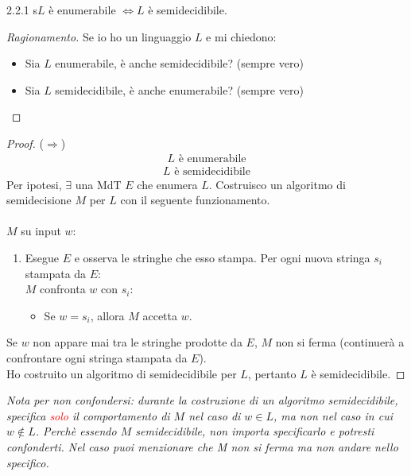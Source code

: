 \documentclass{article}  %
\theoremstyle{definition}
\newenvironment{ragionamento}[1][]
  {\begin{proof}[Ragionamento#1]\renewcommand{\qedsymbol}{}\normalfont}
  {\end{proof}}
\begin{document}
\begin{theorem}{2.2.1}
	s$L$ è enumerabile $\iff L$ è semidecidibile.
	\footnotesize %
	\begin{ragionamento}
		Se io ho un linguaggio $L$ e mi chiedono:
		\begin{itemize}
			\item Sia $L$ enumerabile, è anche semidecidibile? (sempre vero)
			\item Sia $L$ semidecidibile, è anche enumerabile? (sempre vero)
		\end{itemize}
	\end{ragionamento}
	\begin{proof} ($\Longrightarrow$) \\
		\begin{align*}
			L \text{ è enumerabile} \tag*{(ipotesi)}
		\end{align*}
		\begin{align*}
			L \text{ è semidecidibile} \tag*{(tesi)}
		\end{align*}
		Per ipotesi, $\exists$ una MdT $E$ che enumera $L$. Costruisco un algoritmo di semidecisione $M$ per $L$ con il seguente funzionamento. \\ \\
		$M$ su input $w$:
		\begin{enumerate}
			\item Esegue $E$ e osserva le stringhe che esso stampa. Per ogni nuova stringa $s_i$ stampata da $E$: \\
			      $M$ confronta $w$ con $s_i$:
			      \begin{itemize}
				      \item Se $w=s_i$, allora $M$ accetta $w$.
			      \end{itemize}
		\end{enumerate}
		Se $w$ non appare mai tra le stringhe prodotte da $E$, $M$ non si ferma (continuerà a confrontare ogni stringa stampata da $E$). \\
		Ho costruito un algoritmo di semidecidibile per $L$, pertanto $L$ è semidecidibile.
	\end{proof}
	\textit{Nota per non confondersi: durante la costruzione di un algoritmo semidecidibile, specifica \textcolor{red}{solo} il comportamento di $M$ nel caso di $w \in L$, ma non
		nel caso in cui $w \notin L$. Perchè essendo $M$ semidecidibile, non importa specificarlo e potresti confonderti. Nel caso puoi menzionare che
		M non si ferma ma non andare nello specifico.} \\

\end{theorem}
\end{document}
